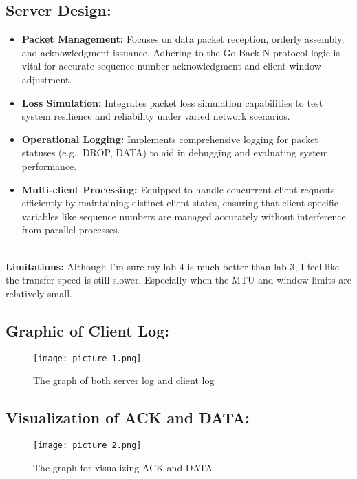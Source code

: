 \documentclass{article}
\begin{document}
\subsection*{Server Design:}
\begin{itemize}
    \item \textbf{Packet Management:} Focuses on data packet reception, orderly assembly, and acknowledgment issuance. Adhering to the Go-Back-N protocol logic is vital for accurate sequence number acknowledgment and client window adjustment.
    
    \item \textbf{Loss Simulation:} Integrates packet loss simulation capabilities to test system resilience and reliability under varied network scenarios.
    
    \item \textbf{Operational Logging:} Implements comprehensive logging for packet statuses (e.g., DROP, DATA) to aid in debugging and evaluating system performance.
    
    \item \textbf{Multi-client Processing:} Equipped to handle concurrent client requests efficiently by maintaining distinct client states, ensuring that client-specific variables like sequence numbers are managed accurately without interference from parallel processes.
\end{itemize}
\\
\textbf{Limitations:}
Although I'm sure my lab 4 is much better than lab 3, I feel like the transfer speed is still slower. Especially when the MTU and window limits are relatively small.

\subsection*{Graphic of Client Log:}
\begin{figure}[H]
  \centering
  \texttt{[image: picture 1.png]}
  \caption{The graph of both server log and client log}
  \label{fig:my_label1}
\end{figure}

\subsection*{Visualization of ACK and DATA: }
\begin{figure}[H]
  \centering
  \texttt{[image: picture 2.png]}
  \caption{The graph for visualizing ACK and DATA}
  \label{fig:my_label2}
\end{figure}
\end{document}
